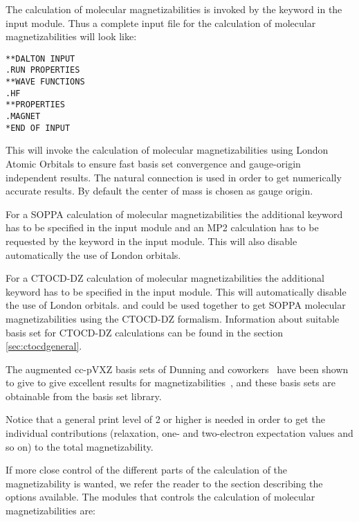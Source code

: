 The calculation of molecular magnetizabilities
is invoked by the
keyword  in the  input module. Thus
a complete input file for the calculation of molecular
magnetizabilities will look like:

\begin{verbatim}
**DALTON INPUT
.RUN PROPERTIES
**WAVE FUNCTIONS
.HF
**PROPERTIES
.MAGNET
*END OF INPUT
\end{verbatim}

This will invoke the calculation of molecular magnetizabilities using
London Atomic Orbitals to ensure fast basis set
convergence and
gauge-origin independent results. The natural
connection
\cite{joklbkrthpjtca90} is used in order to get numerically accurate
results. By default the center of mass is chosen
as gauge origin.

For a SOPPA calculation of molecular magnetizabilities the 
additional 
keyword  has to be specified in the  input module 
and an MP2 calculation has to be requested by the keyword  in the 
 input module. This will also disable automatically
the use of London orbitals.

For a CTOCD-DZ calculation of molecular magnetizabilities the 
additional keyword  has to be specified in the  
input module. This will automatically disable the use of London orbitals.
 and  could be used together to get SOPPA molecular
magnetizabilities using the CTOCD-DZ formalism. Information about suitable basis
set for CTOCD-DZ calculations can be found in the section \ref{sec:ctocdgeneral}.

The augmented cc-pVXZ basis sets of Dunning and
coworkers~\cite{thdjcp90,rakthdrjhjcp96,dewthdjcp98,dewthdjcp100} have
been shown to give  to give excellent results for
magnetizabilities~\cite{krthklbpjhjajjcp99,krthpjklbcpl223,krhsthklbpjjacs116},
and these basis sets are obtainable from the basis set library.

Notice that a general print level of 2 or higher is needed in order to
get the individual contributions (relaxation, one- and
two-electron expectation values and so on) to the total magnetizability.

If more close control of the different parts of the calculation of the
magnetizability is wanted, we refer the reader to the section
describing the options available. The modules that controls the
calculation of molecular magnetizabilities are:

